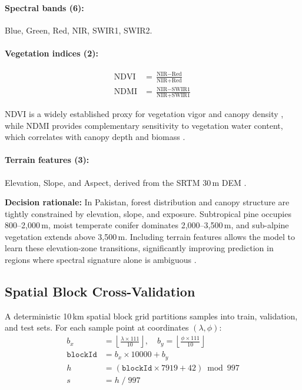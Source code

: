 \documentclass[12pt,a4paper,twoside]{article}
\newcommand{\NDVI}{\text{NDVI}}
\newcommand{\NDMI}{\text{NDMI}}
\begin{document}
\paragraph{Spectral bands (6):} Blue, Green, Red, NIR, SWIR1, SWIR2.

\paragraph{Vegetation indices (2):}
\begin{align}
  \NDVI &= \frac{\text{NIR} - \text{Red}}{\text{NIR} + \text{Red}} \label{eq:ndvi} \\[3pt]
  \NDMI &= \frac{\text{NIR} - \text{SWIR1}}{\text{NIR} + \text{SWIR1}} \label{eq:ndmi}
\end{align}

NDVI is a widely established proxy for vegetation vigor and canopy density
\citep{Tucker1979}, while NDMI provides complementary sensitivity to vegetation
water content, which correlates with canopy depth and biomass \citep{Gao1996}.

\paragraph{Terrain features (3):} Elevation, Slope, and Aspect, derived from the
SRTM 30\,m DEM \citep{Farr2007}.

\textbf{Decision rationale:} In Pakistan, forest distribution and canopy structure
are tightly constrained by elevation, slope, and exposure.  Subtropical pine
occupies 800--2,000\,m, moist temperate conifer dominates 2,000--3,500\,m, and
sub-alpine vegetation extends above 3,500\,m.  Including terrain features allows
the model to learn these elevation-zone transitions, significantly improving
prediction in regions where spectral signature alone is ambiguous \citep{Belgiu2016}.

\subsection{Spatial Block Cross-Validation}\label{sec:spatial_cv}

A deterministic 10\,km spatial block grid partitions samples into train, validation,
and test sets.  For each sample point at coordinates $(\lambda, \phi)$:
\begin{align}
  b_x &= \left\lfloor\frac{\lambda \times 111}{10}\right\rfloor, \quad
  b_y  = \left\lfloor\frac{\phi \times 111}{10}\right\rfloor \label{eq:block_xy} \\
  \texttt{blockId} &= b_x \times 10000 + b_y \label{eq:blockid} \\
  h &= (\texttt{blockId} \times 7919 + 42) \bmod 997 \label{eq:hash} \\
  s &= h \;/\; 997 \label{eq:split}
\end{align}
\end{document}
